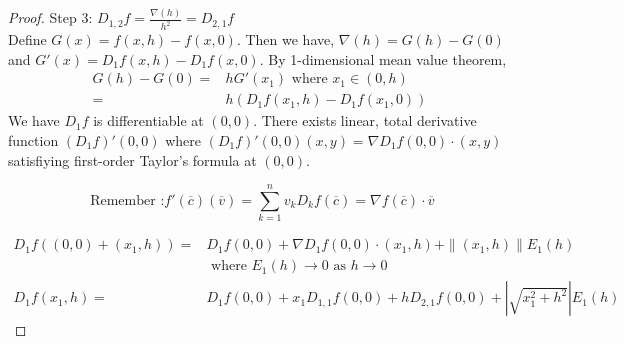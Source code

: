 \begin{proof}
	\par{Step 3:} $D_{1,2} f = \frac{\nabla(h)}{h^2} = D_{2,1} f$\\

	Define $G(x) = f(x,h)-f(x,0)$.
	Then  we have, $\nabla(h) = G(h)-G(0)$ and $G'(x) = D_1f(x,h) - D_1f(x,0)$.
	By 1-dimensional mean value theorem,
	\begin{align*}
		G(h)-G(0) = & hG'(x_1)  \text{ where } x_1 \in (0,h) \\
		= & h\left( D_1f(x_1,h)-D_1f(x_1,0)\right)
	\end{align*}
	We have $D_1 f$ is differentiable at $(0,0)$.
	There exists linear, total derivative function $(D_1f)'(0,0)$ where $(D_1f)'(0,0)(x,y) = \nabla D_1 f(0,0) \cdot{} (x,y)$ satisfiying first-order Taylor's formula at $(0,0)$.\\ 
	\begin{commentary}
		\[ \text{ Remember :} f'(\overline{c})(\overline{v}) = \sum_{k = 1}^n v_k D_k f(\overline{c}) = \nabla f(\overline{c}) \cdot{} \overline{v} \]
	\end{commentary}
	\begin{align*}
		D_1 f((0,0) + (x_1,h)) = & D_1 f(0,0) + \nabla D_1 f(0,0) \cdot{} (x_1,h) + \|(x_1,h)\| E_1(h) \\
		& \text{ where } E_1(h) \to 0 \text{ as } h \to 0\\
		D_1 f(x_1,h) = & D_1 f(0,0) + x_1 D_{1,1} f(0,0) + h D_{2,1} f(0,0) + \left|\sqrt{x_1^2+h^2}\right| E_1(h)
	\end{align*}
	

\end{proof}
